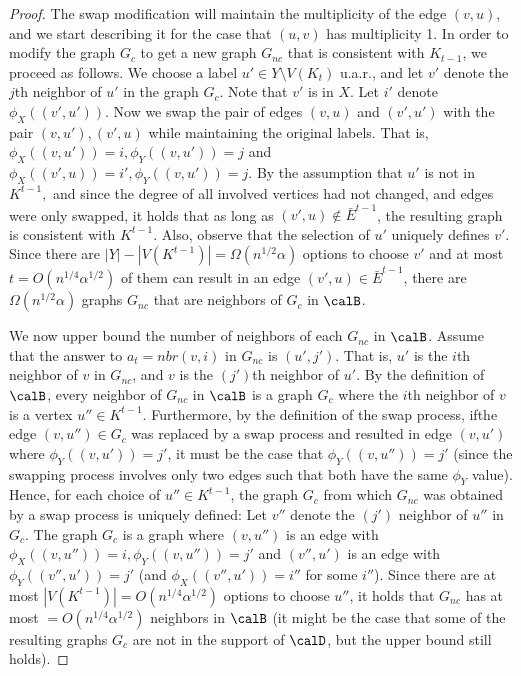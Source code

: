 \begin{proof}
    The swap modification will maintain the multiplicity of the edge $(v,u)$, and we start describing it for  the case that $(u,v)$ has multiplicity 1.  In order to modify the graph $G_c$ to get a new graph $G_{nc}$ that is consistent with $K_{t-1}$, we proceed as follows.
    We choose a label  $u'\in Y\setminus V(K_t)$ u.a.r., and let $v'$ denote the $j$th neighbor of $u'$ in the graph $G_{c}$. Note that $v'$ is in $X$. Let $i'$ denote $\phi_X((v',u'))$. Now we swap the pair of  edges $(v,u)$ 
    and $(v',u')$   with the pair  $(v,u'), (v',u)$  while maintaining the original labels. That is, $\phi_X((v,u'))=i, \phi_Y((v,u'))=j$ and $\phi_X((v',u))=i', \phi_Y((v,u'))=j$. 
    By the assumption that $u'$ is not in $K^{t-1},$ 
    and since the degree of all involved vertices had not changed, and edges were only swapped, 
    it holds that as long as $(v',u)\notin \bar{E}^{t-1}$, the resulting  graph is consistent with $K^{t-1}$. 
    Also, observe that the selection of $u'$ uniquely defines $v'$. 
    Since there are $|Y|-|V(K^{t-1})|=\Omega(n^{1/2}\alpha)$ options to choose $v'$ and at most $t=O(n^{1/4}\alpha^{1/2})$ of them can result in an edge $(v',u)\in  \bar{E}^{t-1}$, there are $\Omega(n^{1/2}\alpha)$ graphs $G_{nc}$ that are neighbors of $G_{c}$ in $\calB$.

    We now upper bound the number of neighbors of each $G_{nc}$ in $\calB$. 
    Assume that the answer to $a_t=nbr(v,i)$ in $G_{nc}$ is $(u',j')$. That is, $u'$ is the $i$th neighbor of $v$ in $G_{nc}$, and $v$ is the $(j')$th neighbor of $u'$.
      By the definition of $\calB$, every neighbor of $G_{nc}$ in $\calB$ is a graph $G_{c}$ where the $i$th neighbor of $v$ is a vertex $u''\in K^{t-1}$. Furthermore, by the definition of the swap process, ifthe edge $(v,u'')\in G_c$ was replaced by a swap process and resulted in edge $(v,u')$ where $\phi_Y((v,u'))=j'$, it must be the case that $\phi_{Y}((v,u''))=j'$ (since the swapping process  involves only two edges such that both have the same $\phi_Y$ value). Hence, for each choice of $u''\in K^{t-1}$, the graph $G_c$ from which $G_{nc}$ was obtained by a swap process is uniquely defined: 
      Let $v''$ denote the $(j')$ neighbor of $u''$ in $G_c$.
      The graph $G_c$ is a graph where  
      $(v,u'')$ is an edge with $\phi_{X}((v,u''))=i, \phi_Y((v,u''))=j'$ and $(v'', u')$ is an edge with $\phi_Y((v'', u'))=j'$ (and $\phi_X((v'', u'))=i''$ for some $i''$). Since there are at most $|V(K^{t-1})|=O(n^{1/4}\alpha^{1/2})$ options to choose $u''$, it holds that $G_{nc}$ has at most $=O(n^{1/4}\alpha^{1/2})$ neighbors in $\calB$ (it might be the case that some of the resulting graphs $G_c$ are not in the support of $\calD$, but the upper bound still holds).


\end{proof}
